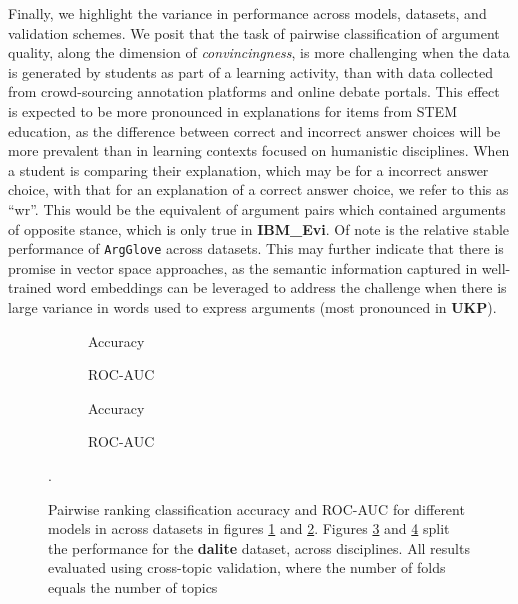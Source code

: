 \documentclass[runningheads]{llncs}
\begin{document}
Finally, we highlight the variance in performance across models, datasets, and 
validation schemes. We posit that the task of pairwise classification of 
argument quality, along the dimension of \textit{convincingness}, is more 
challenging when the data is generated by students as part of a learning 
activity, than with data collected from crowd-sourcing annotation platforms and 
online debate portals. 
This effect is expected to be more pronounced in explanations for items from 
STEM education, as the difference between correct and incorrect answer choices 
will be more prevalent than in learning contexts focused on humanistic 
disciplines.
When a student is comparing their explanation, which may be for a incorrect 
answer choice, with that for an explanation of a correct answer choice, we 
refer to this as ``wr''.
This would be the equivalent of argument pairs which contained arguments of 
opposite stance, which is only true in \textbf{IBM\_Evi}.  
Of note is the relative stable performance of \verb|ArgGlove| across datasets. 
This may further indicate that there is promise in vector space approaches, as 
the semantic information captured in well-trained word embeddings can be 
leveraged to address the challenge when there is large variance in words used 
to express arguments (most pronounced in \textbf{UKP}).


\begin{figure}
	\begin{subfigure}[t]{0.5\linewidth}
		\centering
		\scalebox{0.5}{}
		\caption{Accuracy}
		\label{fig:acc_cross_topic}
	\end{subfigure}%
	\qquad
	\begin{subfigure}[t]{0.5\linewidth}
		\centering
		\scalebox{0.5}{}
		\caption{ROC-AUC}
		\label{fig:AUC_cross_topic}
	\end{subfigure}
	\begin{subfigure}[t]{0.5\linewidth}
		\centering
		\scalebox{0.5}{}
		\caption{Accuracy}
		\label{fig:acc_dalite_cross_topic}
	\end{subfigure}%
	\qquad
	\begin{subfigure}[t]{0.5\linewidth}
		\centering
		\scalebox{0.5}{}
		\caption{ROC-AUC}
		\label{fig:AUC_dalite_cross_topic}
	\end{subfigure}
	\caption{Pairwise ranking classification accuracy and ROC-AUC for 
		different models in across datasets in figures 
		\ref{fig:acc_cross_topic} 
		and \ref{fig:AUC_cross_topic}. Figures \ref{fig:acc_dalite_cross_topic} 
		and 
		\ref{fig:AUC_dalite_cross_topic} split the performance for the 
		\textbf{dalite} dataset, across disciplines. All results evaluated 
		using 
		cross-topic validation, where the number of folds equals the number of 
		topics}.
	\label{fig:performance_cross_topic}
	
\end{figure}
\end{document}
